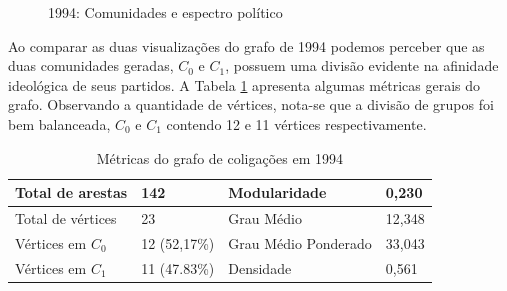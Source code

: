 \begin{figure}[H]
\center
    \qquad
    
    \caption{1994: Comunidades e espectro político}
\end{figure}

Ao comparar as duas visualizações do grafo de 1994 podemos perceber que as duas comunidades geradas, $C_0$ e $C_1$, possuem uma divisão evidente na afinidade ideológica de seus partidos. A Tabela \ref{table-1994} apresenta algumas métricas gerais do grafo. Observando a quantidade de vértices, nota-se que a divisão de grupos foi bem balanceada, $C_0$ e $C_1$ contendo 12 e 11 vértices respectivamente.

\begin{table}[H]
\centering
\begin{tabular}{|l|l|l|l|}
\hline
Total de arestas  & 142 & Modularidade         & 0,230 \\ \hline
Total de vértices & 23   & Grau Médio           & 12,348 \\ \hline
Vértices em $C_0$    & 12 (52,17\%)  & Grau Médio Ponderado & 33,043 \\ \hline
Vértices em $C_1$    & 11 (47.83\%) & Densidade            &  0,561\\ \hline
\end{tabular}
\caption{Métricas do grafo de coligações em 1994}
\label{table-1994}
\end{table}

